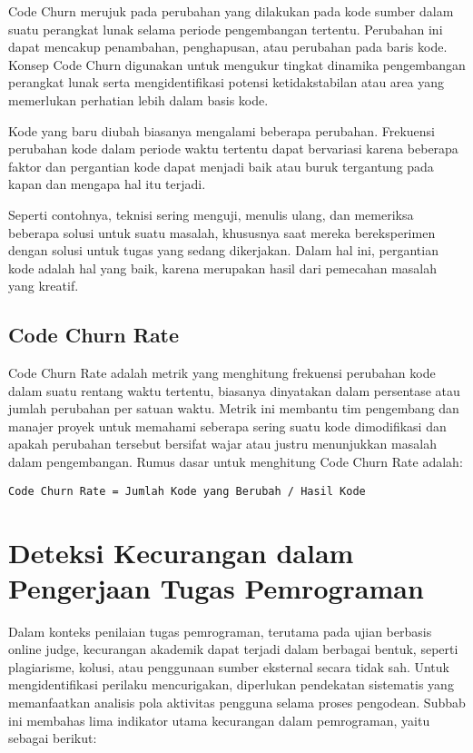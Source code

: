 Code Churn merujuk pada perubahan yang dilakukan pada kode sumber dalam suatu perangkat lunak selama periode pengembangan tertentu. Perubahan ini dapat mencakup penambahan, penghapusan, atau perubahan pada baris kode. Konsep Code Churn digunakan untuk mengukur tingkat dinamika pengembangan perangkat lunak serta mengidentifikasi potensi ketidakstabilan atau area yang memerlukan perhatian lebih dalam basis kode.

Kode yang baru diubah biasanya mengalami beberapa perubahan. Frekuensi perubahan kode dalam periode waktu tertentu dapat bervariasi karena beberapa faktor dan pergantian kode dapat menjadi baik atau buruk tergantung pada kapan dan mengapa hal itu terjadi.

Seperti contohnya, teknisi sering menguji, menulis ulang, dan memeriksa beberapa solusi untuk suatu masalah, khususnya saat mereka bereksperimen dengan solusi untuk tugas yang sedang dikerjakan. Dalam hal ini, pergantian kode adalah hal yang baik, karena merupakan hasil dari pemecahan masalah yang kreatif.

\subsection{Code Churn Rate}

Code Churn Rate adalah metrik yang menghitung frekuensi perubahan kode dalam suatu rentang waktu tertentu, biasanya dinyatakan dalam persentase atau jumlah perubahan per satuan waktu. Metrik ini membantu tim pengembang dan manajer proyek untuk memahami seberapa sering suatu kode dimodifikasi dan apakah perubahan tersebut bersifat wajar atau justru menunjukkan masalah dalam pengembangan. Rumus dasar untuk menghitung Code Churn Rate adalah:

\begin{center}
	\verb|Code Churn Rate = Jumlah Kode yang Berubah / Hasil Kode|
\end{center}

\section{Deteksi Kecurangan dalam Pengerjaan Tugas Pemrograman}
\label{sec:2:deteksikecurangan}

Dalam konteks penilaian tugas pemrograman, terutama pada ujian berbasis online judge, kecurangan akademik dapat terjadi dalam berbagai bentuk, seperti plagiarisme, kolusi, atau penggunaan sumber eksternal secara tidak sah. Untuk mengidentifikasi perilaku mencurigakan, diperlukan pendekatan sistematis yang memanfaatkan analisis pola aktivitas pengguna selama proses pengodean. Subbab ini membahas lima indikator utama kecurangan dalam pemrograman, yaitu sebagai berikut:

